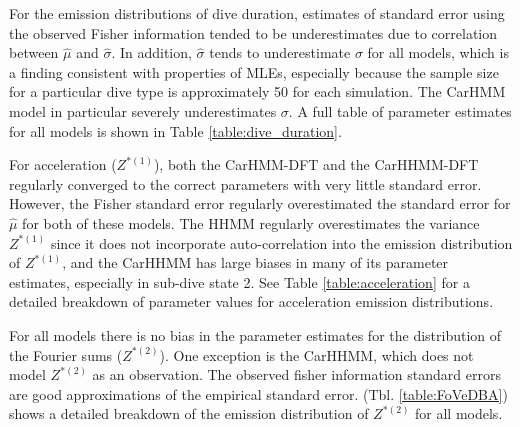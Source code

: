 For the emission distributions of dive duration, estimates of standard error using the observed Fisher information tended to be underestimates due to correlation between $\hat \mu$ and $\hat \sigma$. In addition, $\hat \sigma$ tends to underestimate $\sigma$ for all models, which is a finding consistent with properties of MLEs, especially because the sample size for a particular dive type is approximately 50 for each simulation. The CarHMM model in particular severely underestimates $\sigma$. %
A full table of parameter estimates for all models is shown in Table \ref{table:dive_duration}.


For acceleration ($Z^{*(1)}$), both the CarHMM-DFT and the CarHHMM-DFT regularly converged to the correct parameters with very little standard error. However, the Fisher standard error regularly overestimated the standard error for $\hat \mu$ for both of these models. 
The HHMM regularly overestimates the variance $Z^{*(1)}$ since it does not incorporate auto-correlation into the emission distribution of $Z^{*(1)}$, and the CarHHMM has large biases in many of its parameter estimates, especially in sub-dive state 2. 
See Table \ref{table:acceleration} for a detailed breakdown of parameter values for acceleration emission distributions.

For all models there is no bias in the parameter estimates for the distribution of the Fourier sums ($Z^{*(2)}$). One exception is the CarHHMM, which does not model $Z^{*(2)}$ as an observation. The observed fisher information standard errors are good approximations of the empirical standard error.
(Tbl. \ref{table:FoVeDBA}) shows a detailed breakdown of the emission distribution of $Z^{*(2)}$ for all models.

